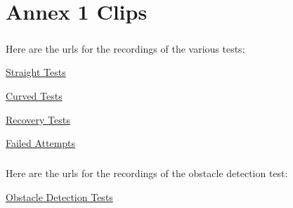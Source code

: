 
%


\chapter{Annex 1 Clips}
\label{ann:annex1}
\paragraph{}Here are the urls for the recordings of the various tests: 

\href{https://unlpt-my.sharepoint.com/:f:/g/personal/ta_pedreira_fct_unl_pt/Es9HrvEmnNZEmHaxqlWF3PsBuXVy-sNh0twCT4zsl-uZcg?e=wikzBa}{Straight Tests}

\href{https://unlpt-my.sharepoint.com/:f:/g/personal/ta_pedreira_fct_unl_pt/EuceHPpljoRMlQ_uhKVa-5QBqYGJl-7xKiMjM-9vr-iImQ?e=8bwu7s}{Curved Tests}

\href{https://unlpt-my.sharepoint.com/:f:/g/personal/ta_pedreira_fct_unl_pt/ErI1Yke-htlHpjyAuzj5jVEBcy60Cer6v6V-Kud-8u2tPg?e=Md1Hs7}{Recovery Tests}

\href{https://unlpt-my.sharepoint.com/:f:/g/personal/ta_pedreira_fct_unl_pt/EgCgbpwvdNVDvzCyHVT2Qz4BRlcTjywyogEOdtnBSGmBoA?e=dQwxP1}{Failed Attempts}
\paragraph{}Here are the urls for the recordings of the obstacle detection test: 

\href{https://unlpt-my.sharepoint.com/:f:/g/personal/ta_pedreira_fct_unl_pt/EtUurZ1JX0JAu0wgAKywEx0BN0WzYc-Xe2hyvlRsNxo-jQ?e=i6FKLz}{Obstacle Detection Tests}
